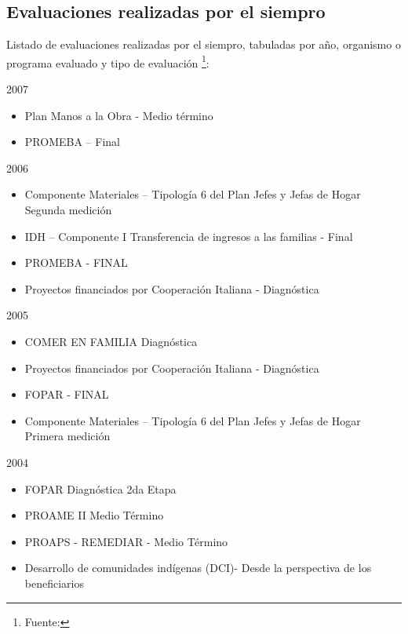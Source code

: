 \subsection{Evaluaciones realizadas por el \acrshort{siempro}} 

Listado de evaluaciones realizadas por el \acrshort{siempro}, tabuladas por año, organismo o programa evaluado y tipo de evaluación \footnote{Fuente: }:

    \begin{description}
    \item{2007}
        \begin{itemize}
            \item Plan Manos a la Obra - Medio término
            \item PROMEBA – Final
        \end{itemize}
    \item{2006}
        \begin{itemize}
            \item Componente Materiales – Tipología 6 del Plan Jefes y Jefas de Hogar Segunda medición
            \item IDH – Componente I Transferencia de ingresos a las familias - Final
            \item PROMEBA - FINAL
            \item Proyectos financiados por Cooperación Italiana - Diagnóstica
        \end{itemize}
    \item{2005}
        \begin{itemize}
        \item COMER EN FAMILIA Diagnóstica
        \item Proyectos financiados por Cooperación Italiana - Diagnóstica
        \item FOPAR - FINAL
        \item Componente Materiales – Tipología 6 del Plan Jefes y Jefas de Hogar Primera medición
        \end{itemize}
    \item{2004}
        \begin{itemize}
            \item FOPAR Diagnóstica 2da Etapa
            \item PROAME II Medio Término
            \item PROAPS - REMEDIAR - Medio Término
            \item Desarrollo de comunidades indígenas (DCI)- Desde la perspectiva de los beneficiarios 

\end{itemize}
\end{description}
